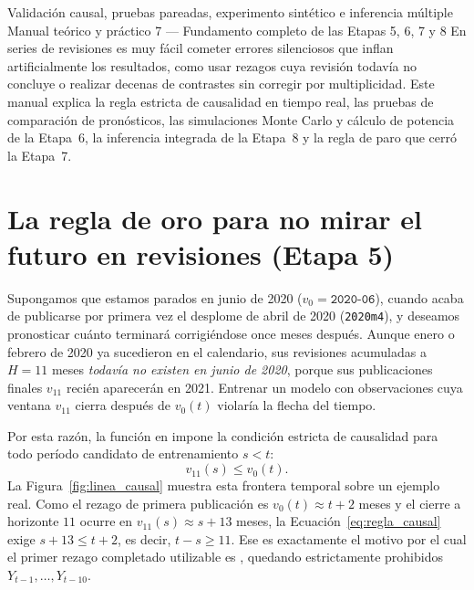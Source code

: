 \documentclass[12pt,letterpaper]{article}
\begin{document}
\apacabecera
  {Validación causal, pruebas pareadas, experimento sintético e inferencia múltiple}
  {Manual teórico y práctico 7 — Fundamento completo de las Etapas 5, 6, 7 y 8}
  {En series de revisiones es muy fácil cometer errores silenciosos que inflan artificialmente los resultados, como usar rezagos cuya revisión todavía no concluye o realizar decenas de contrastes sin corregir por multiplicidad. Este manual explica la regla estricta de causalidad en tiempo real, las pruebas de comparación de pronósticos, las simulaciones Monte Carlo y cálculo de potencia de la Etapa~6, la inferencia integrada de la Etapa~8 y la regla de paro que cerró la Etapa~7.}

\section{La regla de oro para no mirar el futuro en revisiones (Etapa 5)}

Supongamos que estamos parados en junio de 2020 (\(v_0 = \texttt{2020-06}\)), cuando acaba de publicarse por primera vez el desplome de abril de 2020 (\texttt{2020m4}), y deseamos pronosticar cuánto terminará corrigiéndose once meses después. Aunque enero o febrero de 2020 ya sucedieron en el calendario, sus revisiones acumuladas a \(H = 11\) meses \emph{todavía no existen en junio de 2020}, porque sus publicaciones finales \(v_{11}\) recién aparecerán en 2021. Entrenar un modelo con observaciones cuya ventana \(v_{11}\) cierra después de \(v_0(t)\) violaría la flecha del tiempo.

Por esta razón, la función  en  impone la condición estricta de causalidad para todo período candidato de entrenamiento \(s < t\):
\begin{equation}
  v_{11}(s) \le v_0(t).
  \label{eq:regla_causal}
\end{equation}
La Figura~\ref{fig:linea_causal} muestra esta frontera temporal sobre un ejemplo real. Como el rezago de primera publicación es \(v_0(t) \approx t + 2\) meses y el cierre a horizonte \(11\) ocurre en \(v_{11}(s) \approx s + 13\) meses, la Ecuación~\ref{eq:regla_causal} exige \(s + 13 \le t + 2\), es decir, \(t - s \ge 11\). Ese es exactamente el motivo por el cual el primer rezago completado utilizable es , quedando estrictamente prohibidos \(Y_{t-1}, \dots, Y_{t-10}\).
\end{document}
